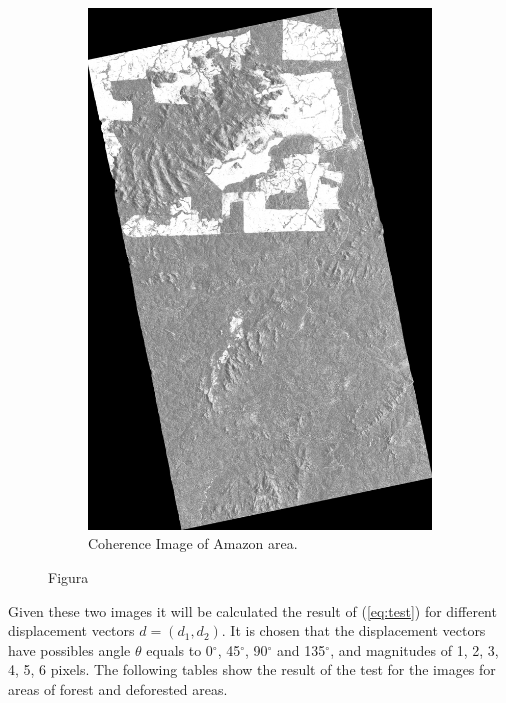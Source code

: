 \begin{figure}[H]
\begin{subfigure}[b]{0.4\linewidth}
      \includegraphics[width=0.8\linewidth]{Chapter4/coSSC_master_gamma_vol.png}
      \caption{Coherence Image of Amazon area.}
    \end{subfigure}
  \caption{Figura}
  \label{fig:asdf}
\end{figure}

Given these two images it will be calculated the result of (\ref{eq:test}) for different displacement vectors
$d=(d_1, d_2)$. It is chosen that the displacement vectors have possibles angle $\theta$ equals to 0$^{\circ}$, 45$^{\circ}$, 90$^{\circ}$ and 135$^{\circ}$, and magnitudes of 1, 2, 3, 4, 5, 6 pixels.
The following tables show the result of the test for the images for areas of forest and deforested areas.



